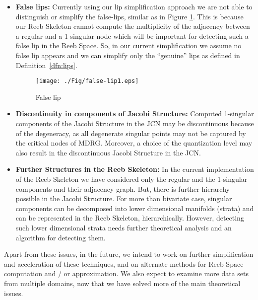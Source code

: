 \documentclass[twocolumn]{article}
\newcommand{\figref}[1]{Figure \ref{fig:#1}}
\begin{document}
\begin{itemize}\itemsep1pt
\item \textbf{False lips:} Currently using our lip simplification
  approach we are not able to distinguish or simplify the false-lips,
  similar as in \figref{falselip}. This is because our Reeb Skeleton cannot compute
the multiplicity of the adjacency between a regular and a 1-singular
node which will be important for detecting such a false lip in the Reeb Space. So, in our current simplification we assume no false lip 
appears and we can simplify only the ``genuine'' lips as defined in Definition~\ref{dfn:lips}.
\begin{figure}[h!]
	\centering
	 \texttt{[image: ./Fig/false-lip1.eps]}  \\
	\caption{False lip}
	\label{fig:falselip}
\end{figure}

\item \textbf{Discontinuity in components of Jacobi Structure:}
  Computed 1-singular components of
  the Jacobi Structure in the JCN may be discontinuous because of the degeneracy, as all degenerate singular points may not be captured by the critical nodes of
  MDRG. Moreover, a choice of the quantization level may also
  result in the discontinuous Jacobi Structure in the JCN. 

\item \textbf{Further Structures in the Reeb Skeleton:} In the current
  implementation of the Reeb Skeleton we have considered only the
  regular and the 1-singular components and their adjacency graph. But, there
  is further hierarchy possible in
  the Jacobi Structure. For more than bivariate case,
  singular components can be decomposed into lower
  dimensional manifolds (strata) and can be represented in the Reeb Skeleton,
  hierarchically. However, detecting such lower dimensional strata needs
  further theoretical analysis and an algorithm for detecting them.
\end{itemize}

\noindent
Apart from these issues, in the future, we intend to work on further simplification and acceleration of these techniques, 
and on alternate methods for Reeb Space computation and / or approximation.  We also expect
to examine more data sets from multiple domains, now that we have solved more of the main theoretical
issues.
%
 




\end{document}
